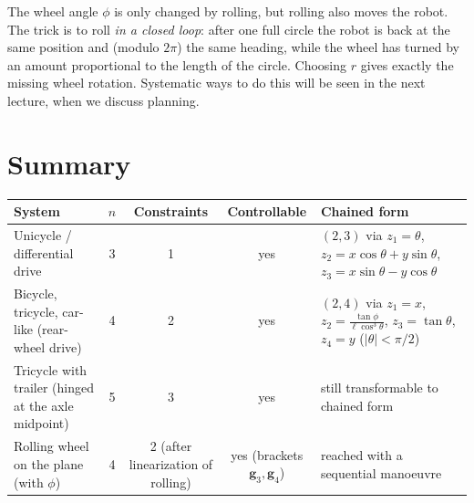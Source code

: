 \documentclass[11pt,a4paper]{article}
\theoremstyle{definition}
\theoremstyle{plain}
\begin{document}
\begin{intuition}
The wheel angle $\phi$ is only changed by rolling, but rolling also moves the robot. The trick is to roll \emph{in a closed loop}: after one full circle the robot is back at the same position and (modulo $2\pi$) the same heading, while the wheel has turned by an amount proportional to the length of the circle. Choosing $r$ gives exactly the missing wheel rotation. Systematic ways to do this will be seen in the next lecture, when we discuss planning.
\end{intuition}


\section{Summary}

\begin{center}
\small
\renewcommand{\arraystretch}{1.25}
\begin{tabular}{p{2.9cm}cccp{4.6cm}}
\toprule
\textbf{System} & $n$ & \textbf{Constraints} & \textbf{Controllable} & \textbf{Chained form}\\
\midrule
Unicycle / differential drive & 3 & 1 & yes & $(2,3)$ via $z_1=\theta$, $z_2=x\cos\theta+y\sin\theta$, $z_3=x\sin\theta-y\cos\theta$\\
Bicycle, tricycle, car-like (rear-wheel drive) & 4 & 2 & yes & $(2,4)$ via $z_1=x$, $z_2=\frac{\tan\phi}{\ell\cos^3\theta}$, $z_3=\tan\theta$, $z_4=y$ ($|\theta|<\pi/2$)\\
Tricycle with trailer (hinged at the axle midpoint) & 5 & 3 & yes & still transformable to chained form\\
Rolling wheel on the plane (with $\phi$) & 4 & 2 (after linearization of rolling) & yes (brackets $\bm g_3,\bm g_4$) & reached with a sequential manoeuvre\\
\bottomrule
\end{tabular}
\end{center}
\end{document}
